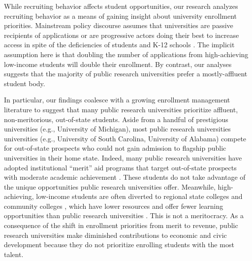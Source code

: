 \documentclass[twoside]{article}
\begin{document}
While recruiting behavior affects student opportunities, our research analyzes recruiting behavior as a means of gaining insight about university enrollment priorities.  Mainstream policy discourse assumes that universities are passive recipients of applications or are progressive actors doing their best to increase access in spite of the deficiencies of students and K-12 schools \cite{RN4016, RN4017}.  The implicit assumption here is that doubling the number of applications from high-achieving low-income students will double their enrollment. By contrast, our analyses suggests that the majority of public research universities prefer a mostly-affluent student body. 

In particular, our findings coalesce with a growing enrollment management literature \citep[e.g., ][]{RN3685,RN3528,RN4409,RN4032} to suggest that many public research universities prioritize affluent, non-meritorious, out-of-state students. Aside from a handful of prestigious universities (e.g., University of Michigan), most public research universities universities (e.g., University of South Carolina, University of Alabama) compete for out-of-state prospects who could not gain admission to flagship public universities in their home state.  Indeed, many public research universities have adopted institutional ``merit'' aid programs that target out-of-state prospects with moderate academic achievement \citep{RN1469,RN3762,RN4032,RN4409}. These students do not take advantage of the unique opportunities public research universities offer.  Meanwhile, high-achieving, low-income students are often diverted to regional state colleges and community colleges \citep{RN4429}, which have lower resources and offer fewer learning opportunities than public research universities \citep{RN532,RN1545}.  This is not a meritocracy.  As a consequence of the shift in enrollment priorities from merit to revenue, public research universities make diminished contributions to economic and civic development because they do not prioritize enrolling students with the most talent.
\end{document}
